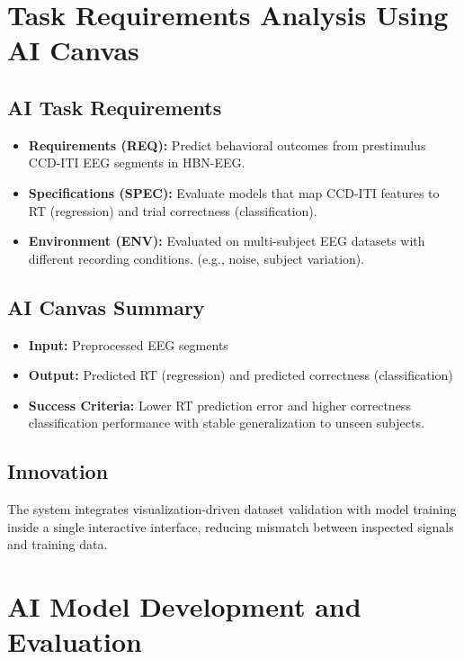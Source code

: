 \section{Task Requirements Analysis Using AI Canvas}
\label{sec:ai-canvas}

\subsection{AI Task Requirements}
\label{subsec:ai-task-requirements}
\begin{itemize}[leftmargin=3.5em]
    \item \textbf{Requirements (REQ):} Predict behavioral outcomes from prestimulus CCD-ITI EEG segments in HBN-EEG.
    \item \textbf{Specifications (SPEC):} Evaluate models that map CCD-ITI features to RT (regression) and trial correctness (classification).
    \item \textbf{Environment (ENV):} Evaluated on multi-subject EEG datasets with different recording conditions. (e.g., noise, subject variation).
\end{itemize}

\subsection{AI Canvas Summary}
\label{subsec:ai-canvas-summary}
\begin{itemize}[leftmargin=3.5em]
    \item \textbf{Input:} Preprocessed EEG segments
    \item \textbf{Output:} Predicted RT (regression) and predicted correctness (classification)
    \item \textbf{Success Criteria:} Lower RT prediction error and higher correctness classification performance with stable generalization to unseen subjects.
\end{itemize}

\subsection{Innovation}
\label{subsec:innovation}
The system integrates visualization-driven dataset validation with model training inside a single interactive interface, reducing mismatch between inspected signals and training data.

\section{AI Model Development and Evaluation}
\label{sec:model-development-evaluation}

